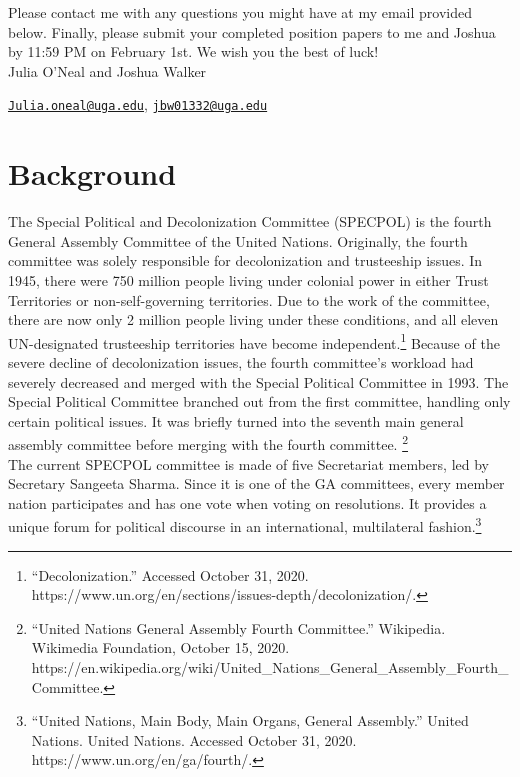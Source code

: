 \documentclass[10pt, letterpaper]{article}
\begin{document}
Please contact me with any questions you might have at my email provided
below. Finally, please submit your completed position papers to me and
Joshua by 11:59 PM on February 1st. We wish you the best of luck! \\

Julia O'Neal and Joshua Walker

\texttt{\href{mailto:Julia.oneal@uga.edu}{{Julia.oneal@uga.edu}}},
\texttt{\href{mailto:jbw01332@uga.edu}{{jbw01332@uga.edu}}}

\newpage
\tableofcontents
\newpage
\section{Background}

The Special Political and Decolonization Committee (SPECPOL) is the
fourth General Assembly Committee of the United Nations. Originally, the
fourth committee was solely responsible for decolonization and
trusteeship issues. In 1945, there were 750 million people living under
colonial power in either Trust Territories or non-self-governing
territories. Due to the work of the committee, there are now only 2
million people living under these conditions, and all eleven
UN-designated trusteeship territories have become
independent.\footnote{``Decolonization.'' Accessed October 31, 2020.
  https://www.un.org/en/sections/issues-depth/decolonization/.} Because
of the severe decline of decolonization issues, the fourth committee's
workload had severely decreased and merged with the Special Political
Committee in 1993. The Special Political Committee branched out from the
first committee, handling only certain political issues. It was briefly
turned into the seventh main general assembly committee before merging
with the fourth committee. \footnote{``United Nations General Assembly
  Fourth Committee.'' Wikipedia. Wikimedia Foundation, October 15, 2020.
  https://en.wikipedia.org/wiki/United\_Nations\_General\_Assembly\_Fourth\_Committee.}\\
  
The current SPECPOL committee is made of five Secretariat members, led
by Secretary Sangeeta Sharma. Since it is one of the GA committees,
every member nation participates and has one vote when voting on
resolutions. It provides a unique forum for political discourse in an
international, multilateral fashion.\footnote{``United Nations, Main
  Body, Main Organs, General Assembly.'' United Nations. United Nations.
  Accessed October 31, 2020. https://www.un.org/en/ga/fourth/.}\\
  
\end{document}
